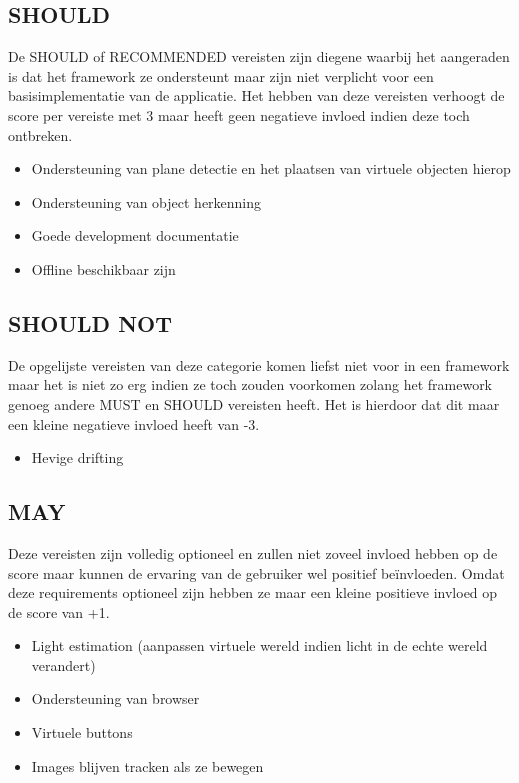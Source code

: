 \subsection{SHOULD}
De SHOULD of RECOMMENDED vereisten zijn diegene waarbij het aangeraden is dat het framework ze ondersteunt maar zijn niet verplicht voor een basisimplementatie van de applicatie. Het hebben van deze vereisten verhoogt de score per vereiste met 3 maar heeft geen negatieve invloed  indien deze toch ontbreken.
\begin{itemize}
    \item Ondersteuning van plane detectie en het plaatsen van virtuele objecten hierop
    \item Ondersteuning van object herkenning
    \item Goede development documentatie
    \item Offline beschikbaar zijn
\end{itemize} 

\subsection{SHOULD NOT}
De opgelijste vereisten van deze categorie komen liefst niet voor in een framework maar het is niet zo erg indien ze toch zouden voorkomen zolang het framework genoeg andere MUST en SHOULD vereisten heeft. Het is hierdoor dat dit maar een kleine negatieve invloed heeft van -3.
\begin{itemize}
    \item Hevige drifting
\end{itemize} 

\subsection{MAY}
Deze vereisten zijn volledig optioneel en zullen niet zoveel invloed hebben op de score maar kunnen de ervaring van de gebruiker wel positief beïnvloeden. Omdat deze requirements optioneel zijn hebben ze maar een kleine positieve invloed op de score van +1.
\begin{itemize}
    \item Light estimation (aanpassen virtuele wereld indien licht in de echte wereld verandert)
    \item Ondersteuning van browser
     \item Virtuele buttons
     \item Images blijven tracken als ze bewegen
\end{itemize} 

